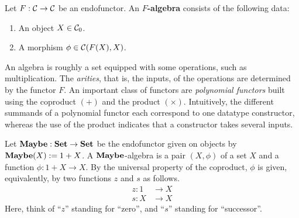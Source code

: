 \begin{dfn} Let $F:\mathcal{C}\to \mathcal{C}$ be an endofunctor. An \textbf{$F$-algebra} consists of the following data:
\begin{enumerate}
\item An object $X\in {\mathcal{C}}_0$.
\item A morphism $\phi \in {\mathcal{C}}(F(X),X)$.
\end{enumerate}
\end{dfn}

\begin{intu}
An algebra is roughly a set equipped with some operations, such as multiplication.
The \emph{arities}, that is, the inputs, of the operations are determined by the functor $F$.
An important class of functors are \emph{polynomial functors} built using the coproduct $(+)$ and the product $(\times)$.
Intuitively, the different summands of a polynomial functor each correspond to one datatype constructor, whereas the use of the product indicates that a constructor takes several inputs.
\end{intu}

\begin{exa}\label{exa:nno_initial_alg_maybe}
 Let $\mathbf{Maybe} : \mathbf{Set} \to \mathbf{Set}$ be the endofunctor given on objects by $\mathbf{Maybe}(X) := 1 + X$. 
 A $\mathbf{Maybe}$-algebra is a pair $(X,\phi)$ of a set $X$ and a function $\phi : 1 + X \to X$.
 By the universal property of the coproduct, $\phi$ is given, equivalently,
 by two functions $z$ and $s$ as follows.
 \begin{align*}
    z : 1 &\to X
    \\
    s : X &\to X
 \end{align*}
Here, think of ``$z$'' standing for ``zero'', and ``$s$'' standing for ``successor''.
\end{exa}


